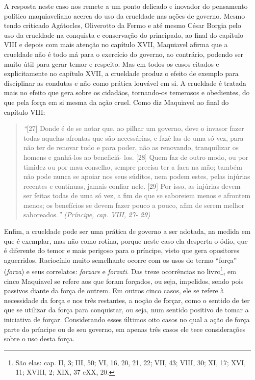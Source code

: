 A resposta neste caso nos remete a um ponto delicado e inovador do
pensamento político maquiaveliano acerca do uso da crueldade nas ações
de governo. Mesmo tendo criticado Agátocles, Oliverotto da Fermo e até
mesmo César Borgia pelo uso da crueldade na conquista e conservação do
principado, ao final do capítulo VIII e depois com mais atenção no
capítulo XVII, Maquiavel afirma que a crueldade não é todo má para o
exercício do governo, ao contrário, podendo ser muito útil para gerar
temor e respeito. Mas em todos os casos citados e explicitamente no
capítulo XVII, a crueldade produz o efeito de exemplo para disciplinar
as condutas e não como prática louvável em si. A crueldade é tratada
mais no efeito que gera sobre os cidadãos, tornando-os temerosos e
obedientes, do que pela força em si mesma da ação cruel. Como diz
Maquiavel ao final do capítulo VIII:

\begin{quote}
\emph{``}{[}27{]} Donde é de se notar que, ao pilhar um governo, deve o
invasor fazer todas aquelas afrontas que são necessárias, e fazê-las de
uma só vez, para não ter de renovar tudo e para poder, não as renovando,
tranquilizar os homens e ganhá-los ao beneficiá- los. {[}28{]} Quem faz
de outro modo, ou por timidez ou por mau conselho, sempre precisa ter a
faca na mão; também não pode nunca se apoiar nos seus súditos, nem podem
estes, pelas injúrias recentes e contínuas, jamais confiar nele.
{[}29{]} Por isso, as injúrias devem ser feitas todas de uma só vez, a
fim de que se saboreiem menos e afrontem menos; os benefícios se devem
fazer pouco a pouco, afim de serem melhor saboreados.\emph{'' (Príncipe,
cap. VIII, 27- 29)}
\end{quote}

Enfim, a crueldade pode ser uma prática de governo a ser adotada, na
medida em que é exemplar, mas não como rotina, porque neste caso ela
desperta o ódio, que é diferente do temor e mais perigoso para o
príncipe, visto que gera opositores aguerridos. Raciocínio muito
semelhante ocorre com os usos do termo ``força'' (\emph{forza}) e seus
correlatos: \emph{forzare} e \emph{forzati}. Das treze ocorrências no
livro\footnote{São elas: cap. II, 3; III, 50; VI, 16, 20, 21, 22; VII, 43; VIII, 30;
  XI, 17; XVI, 11; XVIII, 2; XIX, 37 eXX, 20.}, em cinco Maquiavel se refere aos que foram forçados, ou
seja, impelidos, sendo pois passivos diante da força de outrem. Em
outros cinco casos, ele se refere à necessidade da força e nos três
restantes, a noção de forçar, como o sentido de ter que se utilizar da
força para conquistar, ou seja, num sentido positivo de tomar a
iniciativa de forçar. Considerando esses últimos oito casos no qual a
ação de força parte do príncipe ou de seu governo, em apenas três casos
ele tece considerações sobre o uso desta força.

